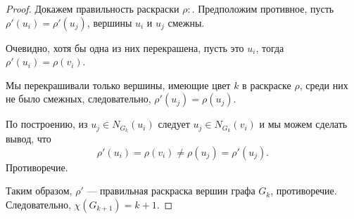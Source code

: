 \begin{proof}
	 Докажем правильность раскраски $\rho:$. Предположим противное, пусть $\rho' (u_i ) = \rho' (u_j )$, вершины $u_i$ и $u_j$ смежны.

	 Очевидно, хотя бы одна из них перекрашена, пусть это $u_i$, тогда $\rho'(u_i) = \rho(v_i)$. 

	 Мы перекрашивали только вершины, имеющие цвет $k$ в раскраске $\rho$, среди них не было смежных, следовательно, $\rho' (u_j ) = \rho(u_j )$.

	 По построению, из $u_j \in N_{G_k} (u_i )$ следует $u_j \in  N_{G_k} (v_i )$ и мы можем сделать вывод, что \[
	 \rho'(u_i) = \rho(v_i) \neq \rho(u_j) = \rho'(u_j)
	 .\] 
	 Противоречие. 

	 Таким образом, $\rho'$ --- правильная раскраска вершин графа $G_k$, противоречие. Следовательно, $\chi(G_{k+1}) = k + 1$.

\end{proof}

